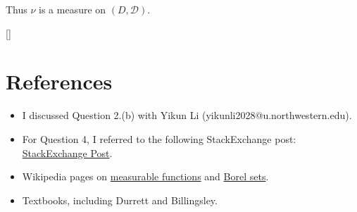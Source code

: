 \documentclass[11pt,a4paper]{article}
\numberwithin{equation}{section}%
\begin{document}
Thus $ \nu $ is a measure on $ (D,\mathcal{D}) $.

    
[]
\section{References}

\begin{itemize}[topsep=2pt,itemsep=0pt]
    \item I discussed Question 2.(b) with Yikun Li (yikunli2028@u.northwestern.edu).
    \item For Question 4, I referred to the following StackExchange post: \href{https://math.stackexchange.com/questions/189567/prove-that-borel-sigma-field-on-rd-is-the-smallest-sigma-field-that-makes-all}{StackExchange Post}.
    \item Wikipedia pages on \href{https://en.wikipedia.org/wiki/Measurable_function}{measurable functions} and \href{https://en.wikipedia.org/wiki/Borel_set}{Borel sets}.
    \item Textbooks, including Durrett and Billingsley.
\end{itemize}
    





    




    
\end{document}
